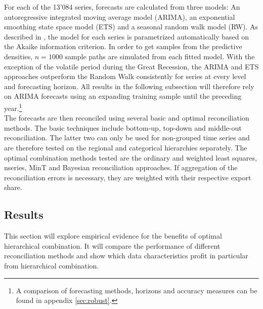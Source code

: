 \documentclass[a4paper,fleqn,11pt]{article}
\begin{document}
For each of the 13'084 series, forecasts are calculated from three models: An autoregressive integrated moving average model (ARIMA), an exponential smoothing state space model (ETS) and a seasonal random walk model (RW). As described in \cite{Hyndman2008}, the model for each series is parametrized automatically based on the Akaike information criterion. In order to get samples from the predictive densities, $n = 1000$ sample paths are simulated from each fitted model. With the exception of the volatile period during the Great Recession, the ARIMA and ETS approaches outperform the Random Walk consistently for series at every level and forecasting horizon. All results in the following subsection will therefore rely on ARIMA forecasts using an expanding training sample until the preceding year.\footnote{A comparison of forecasting methods, horizons and accuracy measures can be found in appendix \ref{sec:robust}.}\\

The forecasts are then reconciled using several basic and optimal reconciliation methods. The basic techniques include bottom-up, top-down and middle-out reconciliation. The latter two can only be used for non-grouped time series and are therefore tested on the regional and categorical hierarchies separately. The optimal combination methods tested are the ordinary and weighted least squares, nseries, MinT and Bayesian reconciliation approaches. If aggregation of the reconciliation errors is necessary, they are weighted with their respective export share.\\

\subsection{Results}
This section will explore empirical evidence for the benefits of optimal hierarchical combination. It will compare the performance of different reconciliation methods and show which data characteristics profit in particular from hierarchical combination.\\
 
\end{document}
